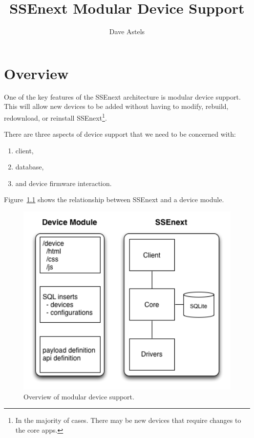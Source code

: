 \documentclass[12pt]{report}
\title{SSEnext Modular Device Support}
\author{Dave Astels}
\begin{document}
\maketitle

\chapter{Overview}

One of the key features of the SSEnext architecture is modular device
support. This will allow new devices to be added without having to
modify, rebuild, redownload, or reinstall SSEnext\footnote{In the
  majority of cases. There may be new devices that require changes to
  the core apps.}.

There are three aspects of device support that we need to be concerned
with:
\begin{enumerate}
\item client,
\item database,
\item and device firmware interaction.
\end{enumerate}

Figure~\ref{fig:blockdiagram} shows the relationship between SSEnext
and a device module.

\begin{figure}[htbp] %
   \centering
   \includegraphics[width=5in]{block_diagram.png} 
\caption{Overview of modular device support.}
\label{fig:blockdiagram}
\end{figure}
\end{document}
